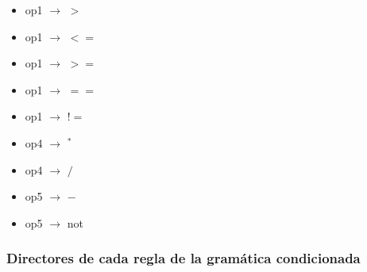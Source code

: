 \documentclass[11pt]{article}
\begin{document}
\begin{itemize}
                \item op1 $\rightarrow$ $>$
                \item op1 $\rightarrow$ $<=$
                \item op1 $\rightarrow$ $>=$
                \item op1 $\rightarrow$ $==$
                \item op1 $\rightarrow$ $!=$
                \item op4 $\rightarrow$ $^{\ast}$
                \item op4 $\rightarrow$ $/$
                \item op5 $\rightarrow$ $-$
                \item op5 $\rightarrow$ not
            \end{itemize}
            \subsubsection{Directores de cada regla de la gramática condicionada}
\end{document}
